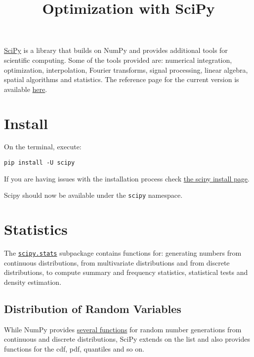 \documentclass[12pt, a4paper]{article}
\date{}
\title{Optimization with SciPy}
\begin{document}
\maketitle
\href{https://www.scipy.org}{SciPy} is a library that builds on NumPy and provides additional tools for scientific computing.
Some of the tools provided are: numerical integration, optimization, interpolation, Fourier transforms, signal processing, linear algebra, spatial algorithms and statistics.
The reference page for the current version is available \href{https://docs.scipy.org/doc/scipy-1.3.0/reference/}{here}.
\section{Install}
\label{sec:orgba9d682}
On the terminal, execute:
\lstset{language=jupyter-python,label= ,caption= ,captionpos=b,numbers=none}
\begin{lstlisting}
pip install -U scipy
\end{lstlisting}
If you are having issues with the installation process check \href{https://scipy.org/install.html}{the scipy install page}.

Scipy should now be available under the \texttt{scipy} namespace.
\section{Statistics}
\label{sec:org57ce3cb}
The \href{https://docs.scipy.org/doc/scipy/reference/stats.html}{\texttt{scipy.stats}} subpackage contains functions for: generating numbers from continuous distributions, from multivariate distributions and from discrete distributions, to compute summary and frequency statistics, statistical tests and density estimation.
\subsection{Distribution of Random Variables}
\label{sec:orgae684bf}
While NumPy provides \href{https://docs.scipy.org/doc/numpy/reference/routines.random.html}{several functions} for random number generations from continuous and discrete distributions, SciPy extends on the list and also provides functions for the cdf, pdf, quantiles and so on.
\end{document}
